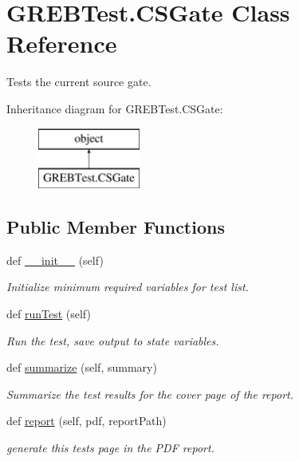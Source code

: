 \hypertarget{class_g_r_e_b_test_1_1_c_s_gate}{}\section{G\+R\+E\+B\+Test.\+C\+S\+Gate Class Reference}
\label{class_g_r_e_b_test_1_1_c_s_gate}


Tests the current source gate.  


Inheritance diagram for G\+R\+E\+B\+Test.\+C\+S\+Gate\+:\begin{figure}[H]
\begin{center}
\leavevmode
\includegraphics[height=2.000000cm]{class_g_r_e_b_test_1_1_c_s_gate}
\end{center}
\end{figure}
\subsection*{Public Member Functions}
\begin{DoxyCompactItemize}
\item 
def \hyperlink{class_g_r_e_b_test_1_1_c_s_gate_aaa67ea03a3a0f3c4e025c2f2fcf00547}{\+\_\+\+\_\+init\+\_\+\+\_\+} (self)
\begin{DoxyCompactList}\small\item\em Initialize minimum required variables for test list. \end{DoxyCompactList}\item 
def \hyperlink{class_g_r_e_b_test_1_1_c_s_gate_a4642819df1ae2fde9bf9fb14791b3d26}{run\+Test} (self)
\begin{DoxyCompactList}\small\item\em Run the test, save output to state variables. \end{DoxyCompactList}\item 
def \hyperlink{class_g_r_e_b_test_1_1_c_s_gate_afc9725472e61ad63c780ab0c186f14e4}{summarize} (self, summary)
\begin{DoxyCompactList}\small\item\em Summarize the test results for the cover page of the report. \end{DoxyCompactList}\item 
def \hyperlink{class_g_r_e_b_test_1_1_c_s_gate_a115b6c2e2446839ac38f180986fc9d41}{report} (self, pdf, report\+Path)
\begin{DoxyCompactList}\small\item\em generate this test\textquotesingle{}s page in the P\+DF report. \end{DoxyCompactList}\end{DoxyCompactItemize}



